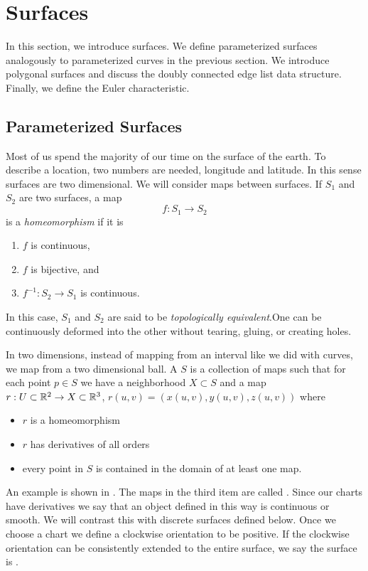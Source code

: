 
\section{Surfaces}

In this section, we introduce surfaces. We define parameterized surfaces analogously to 
parameterized curves in the previous section. We introduce polygonal surfaces and discuss
the doubly connected edge list data structure. Finally, we define the Euler characteristic.


\subsection{Parameterized Surfaces}

Most of us spend the majority of our time on the surface of the earth. To describe a location, two numbers are needed, longitude and latitude. 
In this sense surfaces are two dimensional.
We will consider maps between surfaces.
If $S_1$ and $S_2$ are two surfaces, a map
$$f:S_1\rightarrow S_2$$
is a \emph{homeomorphism} if it is
\begin{enumerate}
    \item \(f\) is continuous,
    \item \(f\) is bijective, and
    \item \(f^{-1}:S_2\to S_1\) is continuous.
\end{enumerate}
In this case, \(S_1\) and \(S_2\) are said to be \emph{topologically equivalent}.One can be continuously deformed into the other without tearing, gluing, or
creating holes.

In two dimensions, instead of mapping from an interval like we did with curves,
 we map from a two dimensional ball.
A  $S$ is a collection of maps such that
 for each point $p\in S$ we have a neighborhood $X\subset S$
 and a map $r:U\subset \mathbb{R}^2 \to X\subset \mathbb{R}^3$, $r(u,v)=(x(u,v),y(u,v),z(u,v))$
 where
 \begin{itemize}
 \item  $r$ is a homeomorphism
 \item $r$ has derivatives of all orders
 \item every point in $S$ is contained in the domain of at least one map.
\end{itemize}
An example is shown in . 
The maps in the third item are called . Since our charts have derivatives we say that an object defined in this way is continuous or smooth. We will contrast this with discrete surfaces defined below.
Once we choose a chart we define a clockwise orientation to be positive.
 If the clockwise orientation can be consistently extended to the entire surface, we say
the surface is .

